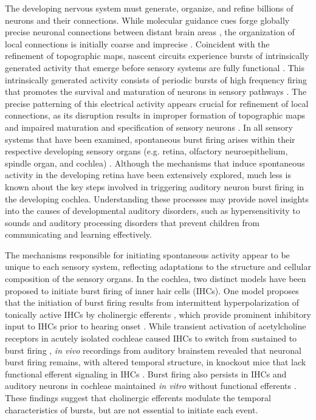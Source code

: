 \documentclass[9pt,lineno]{elife}
\begin{document}
The developing nervous system must generate, organize, and refine billions of neurons and their connections. While molecular guidance cues forge globally precise neuronal connections between distant brain areas \citep{Stoeckli2018,Dickson2002}, the organization of local connections is initially coarse and imprecise \citep{Dhande2011,Kirkby2013,Sretavan1986}. Coincident with the refinement of topographic maps, nascent circuits experience bursts of intrinsically generated activity that emerge before sensory systems are fully functional \citep{Kirkby2013}. This intrinsically generated activity consists of periodic bursts of high frequency firing that promotes the survival and maturation of neurons in sensory pathways \citep{Blankenship2010, Moody2005}. The precise patterning of this electrical activity appears crucial for refinement of local connections, as its disruption results in improper formation of topographic maps \citep{Anton-Bolanos2019,Burbridge2014,Xu2011} and impaired maturation and specification of sensory neurons \citep{Shrestha2018b,Sun2018}. In all sensory systems that have been examined, spontaneous burst firing arises within their respective developing sensory organs (e.g. retina, olfactory neuroepithelium, spindle organ, and cochlea)  \citep{Blankenship2010,Yu2004}. Although the mechanisms that induce spontaneous activity in the developing retina have been extensively explored, much less is known about the key steps involved in triggering auditory neuron burst firing in the developing cochlea. Understanding these processes may provide novel insights into the causes of developmental auditory disorders, such as hypersensitivity to sounds and auditory processing disorders that prevent children from communicating and learning effectively.

The mechanisms responsible for initiating spontaneous activity appear to be unique to each sensory system, reflecting adaptations to the structure and cellular composition of the sensory organs. In the cochlea, two distinct models have been proposed to initiate burst firing of inner hair cells (IHCs). One model proposes that the initiation of burst firing results from intermittent hyperpolarization of tonically active IHCs by cholinergic efferents \citep{Johnson2011, Wang2014}, which provide prominent inhibitory input to IHCs prior to hearing onset \citep{Glowatzki2000}. While transient activation of acetylcholine receptors in acutely isolated cochleae caused IHCs to switch from sustained to burst firing \citep{Johnson2011}, \textit{in vivo} recordings from auditory brainstem revealed that neuronal burst firing remains, with altered temporal structure, in  knockout mice \citep{Clause2014} that lack functional efferent signaling in IHCs \citep{Johnson2013}. Burst firing also persists in IHCs and auditory neurons in cochleae maintained \textit{in vitro} without functional efferents \citep{Johnson2013,Tritsch2007}. These findings suggest that cholinergic efferents modulate the temporal characteristics of bursts, but are not essential to initiate each event. 
\end{document}
